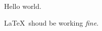 \documentclass{article}
\begin{document}
Hello world.\par
\LaTeX~shoud be working \emph{fine}.
\end{document}
